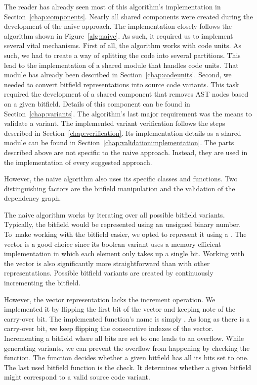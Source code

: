 The reader has already seen most of this algorithm's implementation in 
Section~\ref{chap:components}. 
Nearly all shared components were created during the development of 
the naive approach. 
The implementation closely follows the algorithm shown in 
Figure~\ref{alg:naive}. 
As such, it required us to implement several vital mechanisms. 
First of all, the algorithm works with code units. 
As such, we had to create a way of splitting the code into several 
partitions. 
This lead to the implementation of a shared module that handles code units. 
That module has already been described in Section~\ref{chap:codeunits}. 
Second, we needed to convert bitfield representations into source code 
variants. 
This task required the development of a shared component that removes AST 
nodes based on a given bitfield. 
Details of this component can be found in Section~\ref{chap:variants}. 
The algorithm's last major requirement was the means to validate a variant. 
The implemented variant verification follows the steps described in 
Section~\ref{chap:verification}. 
Its implementation details as a shared module can be found in 
Section~\ref{chap:validationimplementation}.
The parts described above are not specific to the naive approach. 
Instead, they are used in the implementation of every suggested approach. 

However, the naive algorithm also uses its specific classes and functions. 
Two distinguishing factors are the bitfield manipulation and the validation 
of the dependency graph.

The naive algorithm works by iterating over all possible bitfield variants. 
Typically, the bitfield would be represented using an unsigned binary 
number. 
To~make working with the bitfield easier, we opted to represent it using 
a . 
The vector is a good choice since its boolean variant uses 
a memory-efficient implementation in which each element only takes up 
a single bit. 
Working with the vector is also significantly more straightforward than 
with other representations. 
Possible bitfield variants are created by continuously incrementing 
the bitfield. 

However, the vector representation lacks the increment operation. 
We implemented it by flipping the first bit of the vector and keeping 
note of the carry-over bit. 
The implemented function's name is simply . 
As long as there is a carry-over bit, we keep flipping the consecutive 
indexes of the vector. 
Incrementing a bitfield where all bits are set to one leads to an overflow. 
While generating variants, we can prevent the overflow from happening by 
checking the  function. 
The function decides whether a given bitfield has all its bits set to one. 
The last used bitfield function is the  check. 
It determines whether a given bitfield might correspond to a valid source 
code variant. 

